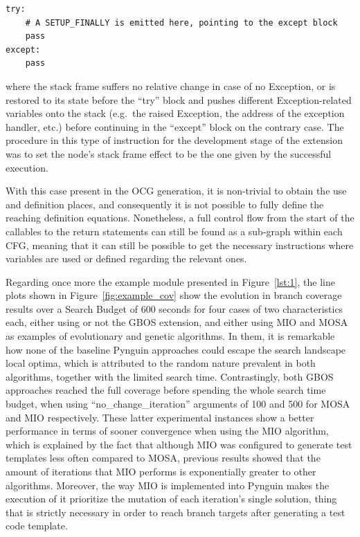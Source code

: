 \documentclass[%
  chapterprefix=false,%
  open=right,%
  twoside=true,%
  paper=a4,%
  logofile={Figures/logo.png},%
  thesistype=master,%
  UKenglish,%
]{se2thesis}
\begin{document}
\begin{verbatim}
try:
    # A SETUP_FINALLY is emitted here, pointing to the except block
    pass
except:
    pass
\end{verbatim}

where the stack frame suffers no relative change in case of no Exception, or is restored to its state before the ``try'' block and pushes different Exception-related variables onto the stack (e.g.~the raised Exception, the address of the exception handler, etc.) before continuing in the ``except'' block on the contrary case.  
The procedure in this type of instruction for the development stage of the extension was to set the node's stack frame effect to be the one given by the successful execution.

With this case present in the OCG generation, it is non-trivial to obtain the use and definition places, and consequently it is not possible to fully define the reaching definition equations.
Nonetheless, a full control flow from the start of the callables to the return statements can still be found as a sub-graph within each CFG, meaning that it can still be possible to get the necessary instructions where variables are used or defined regarding the relevant ones.

Regarding once more the example module presented in Figure~\ref{lst:1}, the line plots shown in Figure~\ref{fig:example_cov} show the evolution in branch coverage results over a Search Budget of 600 seconds for four cases of two characteristics each, either using or not the GBOS extension, and either using MIO and MOSA as examples of evolutionary and genetic algorithms.
In them, it is remarkable how none of the baseline Pynguin approaches could escape the search landscape local optima, which is attributed to the random nature prevalent in both algorithms, together with the limited search time.
Contrastingly, both GBOS approaches reached the full coverage before spending the whole search time budget, when using ``no\_change\_iteration'' arguments of 100 and 500 for MOSA and MIO respectively.
These latter experimental instances show a better performance in terms of sooner convergence when using the MIO algorithm, which is explained by the fact that although MIO was configured to generate test templates less often compared to MOSA, previous results showed that the amount of iterations that MIO performs is exponentially greater to other algorithms.
Moreover, the way MIO is implemented into Pynguin makes the execution of it prioritize the mutation of each iteration's single solution, thing that is strictly necessary in order to reach branch targets after generating a test code template. 
\end{document}
